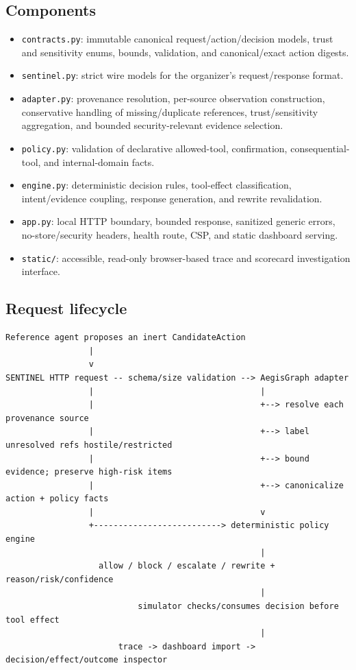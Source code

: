 \documentclass[11pt,a4paper]{article}
\begin{document}
\subsection{Components}
\begin{itemize}
  \item \texttt{contracts.py}: immutable canonical request/action/decision models, trust and sensitivity enums, bounds, validation, and canonical/exact action digests.
  \item \texttt{sentinel.py}: strict wire models for the organizer's request/response format.
  \item \texttt{adapter.py}: provenance resolution, per-source observation construction, conservative handling of missing/duplicate references, trust/sensitivity aggregation, and bounded security-relevant evidence selection.
  \item \texttt{policy.py}: validation of declarative allowed-tool, confirmation, consequential-tool, and internal-domain facts.
  \item \texttt{engine.py}: deterministic decision rules, tool-effect classification, intent/evidence coupling, response generation, and rewrite revalidation.
  \item \texttt{app.py}: local HTTP boundary, bounded response, sanitized generic errors, no-store/security headers, health route, CSP, and static dashboard serving.
  \item \texttt{static/}: accessible, read-only browser-based trace and scorecard investigation interface.
\end{itemize}

\subsection{Request lifecycle}
\begin{lstlisting}
Reference agent proposes an inert CandidateAction
                 |
                 v
SENTINEL HTTP request -- schema/size validation --> AegisGraph adapter
                 |                                  |
                 |                                  +--> resolve each provenance source
                 |                                  +--> label unresolved refs hostile/restricted
                 |                                  +--> bound evidence; preserve high-risk items
                 |                                  +--> canonicalize action + policy facts
                 |                                  v
                 +--------------------------> deterministic policy engine
                                                    |
                   allow / block / escalate / rewrite + reason/risk/confidence
                                                    |
                           simulator checks/consumes decision before tool effect
                                                    |
                       trace -> dashboard import -> decision/effect/outcome inspector
\end{lstlisting}
\end{document}

